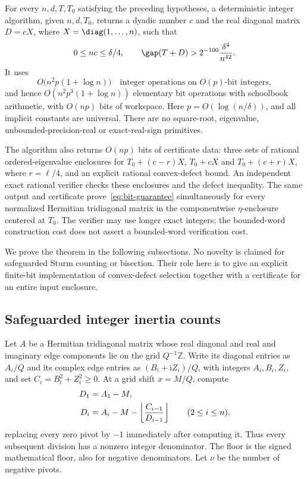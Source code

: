 \begin{theorem}
\label{thm:finite-bit}
For every $n,d,T,T_0$ satisfying the preceding hypotheses, a
deterministic integer algorithm, given $n,d,T_0$, returns a dyadic
number $c$ and the real diagonal matrix $D=cX$, where
$X=\diag(1,\ldots,n)$, such that
\begin{equation}\label{eq:bit-guarantee}
 0\leq nc\leq\delta/4,\qquad
 \gap(T+D)>2^{-100}\frac{\delta^4}{n^{42}}.
\end{equation}
It uses
\begin{equation}\label{eq:bit-cost}
 O\bigl(n^2p(1+\log n)\bigr)
 \quad\text{integer operations on $O(p)$-bit integers},
\end{equation}
and hence $O(n^2p^3(1+\log n))$ elementary bit operations with
schoolbook arithmetic, with $O(np)$ bits of workspace. Here
$p=O(\log(n/\delta))$, and all implicit constants are universal.
There are no square-root, eigenvalue, unbounded-precision-real or
exact-real-sign primitives.

The algorithm also returns $O(np)$ bits of certificate data:
three sets of rational ordered-eigenvalue enclosures for
$T_0+(c-r)X$, $T_0+cX$ and $T_0+(c+r)X$, where $r=\ell/4$,
and an explicit rational convex-defect bound. An independent exact
rational verifier checks these enclosures and the defect inequality.
The same output and certificate prove~\eqref{eq:bit-guarantee}
simultaneously for every normalized Hermitian tridiagonal matrix in
the componentwise $\eta$-enclosure centered at $T_0$.
The verifier may use longer exact integers; the bounded-word
construction cost does not assert a bounded-word verification cost.
\end{theorem}

We prove the theorem in the following subsections. No novelty is
claimed for safeguarded Sturm counting or bisection. Their role here
is to give an explicit finite-bit implementation of convex-defect
selection together with a certificate for an entire input enclosure.

\subsection{Safeguarded integer inertia counts}
\label{subsec:bit-inertia}

Let $A$ be a Hermitian tridiagonal matrix whose real diagonal and
real and imaginary edge components lie on the grid $Q^{-1}\mathbb Z$.
Write its diagonal entries as $A_i/Q$ and its complex edge entries
as $(B_i+\mathrm i Z_i)/Q$, with integers $A_i,B_i,Z_i$, and set
$C_i=B_i^2+Z_i^2\geq0$. At a grid shift $x=M/Q$, compute
\begin{align}
 D_1&=A_1-M,\label{eq:bit-pivots}\\
 D_i&=A_i-M-\left\lfloor\frac{C_{i-1}}{D_{i-1}}\right\rfloor
       \qquad(2\leq i\leq n),\notag
\end{align}
replacing every zero pivot by $-1$ immediately after computing it.
Thus every subsequent division has a nonzero integer denominator.
The floor is the signed mathematical floor, also for negative
denominators. Let $\nu$ be the number of negative pivots.

